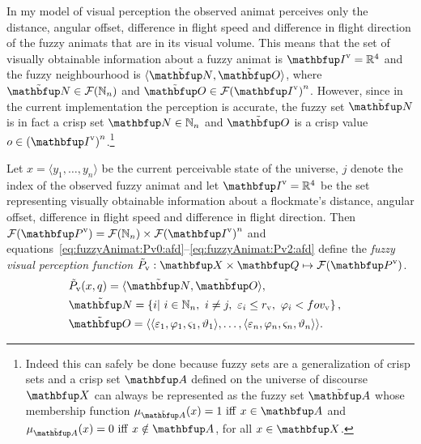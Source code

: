 In my model of visual perception the observed animat perceives only the distance, angular offset, difference in flight speed and difference in flight direction of the fuzzy animats that are in its visual volume. This means that the set of visually obtainable information about a fuzzy animat is $\set{I}^\textnormal{v}=\R^4$ and the fuzzy neighbourhood is $\langle\fset{N},\fset{O}\rangle$, where $\fset{N} \in \fpowset{\N_n}$ and $\fset{O} \in \fpowset{\set{I}^\textnormal{v}}^n$. However, since in the current implementation the perception is accurate, the fuzzy set $\fset{N}$ is in fact a crisp set $\set{N} \in \N_n$ and $\fset{O}$ is a crisp value $o \in {(\set{I}^\textnormal{v})}^n$.\footnote{Indeed this can safely be done because fuzzy sets are a generalization of crisp sets and a crisp set $\set{A}$ defined on the universe of discourse $\set{X}$ can always be represented as the fuzzy set $\fset{A}$ whose membership function $\mu_\fset{A}(x)=1\ \mathrm{iff}\ x \in \set{A}$ and $\mu_\fset{A}(x)=0\ \mathrm{iff}\ x \notin \set{A}$, for all $x \in \set{X}$.}

\begin{definition}
\label{def:fuzzyAnimat:Pv:afd}
Let $x=\langle y_1,\ldots,y_n\rangle$ be the current perceivable state of the universe, $j$ denote the index of the observed fuzzy animat and let $\set{I}^\textnormal{v}=\R^4$ be the set representing visually obtainable information about a flockmate's distance, angular offset, difference in flight speed and difference in flight direction. Then $\fpowset{\set{P}^\textnormal{v}}=\fpowset{\N_n} \times \fpowset{\set{I}^\textnormal{v}}^n$ and equations~\eqref{eq:fuzzyAnimat:Pv0:afd}--\eqref{eq:fuzzyAnimat:Pv2:afd} define the \emph{fuzzy visual perception function} $\ffunc{P}_\textnormal{v}: \set{X} \times \set{Q} \mapsto \fpowset{\set{P}^\textnormal{v}}$.
\begin{eqnarray}
& \ffunc{P}_\textnormal{v}(x,q)=\langle\fset{N},\fset{O}\rangle, & \label{eq:fuzzyAnimat:Pv0:afd} \\
& \fset{N}=\left\{i|\ i \in \N_n,\ i \neq j,\ \varepsilon_i%
 \leq r_\textnormal{v},\ \varphi_i%
 < \fov_\textnormal{v} \right\}, & \\ 
& \fset{O}=\langle \langle \varepsilon_1, \varphi_1, \varsigma_1, \vartheta_1 \rangle, \ldots,
\langle \varepsilon_n, \varphi_n, \varsigma_n, \vartheta_n \rangle \rangle. & \label{eq:fuzzyAnimat:Pv2:afd}
\end{eqnarray}
\end{definition}
 

